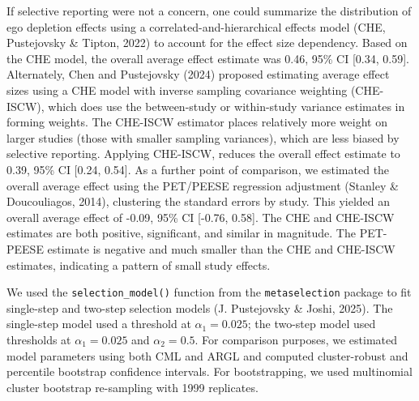 \documentclass[
  man, donotrepeattitle,floatsintext]{apa7}
\begin{document}
If selective reporting were not a concern, one could summarize the distribution of ego depletion effects using a correlated-and-hierarchical effects model (CHE, Pustejovsky \& Tipton, 2022) to account for the effect size dependency.
Based on the CHE model, the overall average effect estimate was 0.46, 95\% CI {[}0.34, 0.59{]}.
Alternately, Chen and Pustejovsky (2024) proposed estimating average effect sizes using a CHE model with inverse sampling covariance weighting (CHE-ISCW), which does use the between-study or within-study variance estimates in forming weights. The CHE-ISCW estimator places relatively more weight on larger studies (those with smaller sampling variances), which are less biased by selective reporting.
Applying CHE-ISCW, reduces the overall effect estimate to 0.39, 95\% CI {[}0.24, 0.54{]}.
As a further point of comparison, we estimated the overall average effect using the PET/PEESE regression adjustment (Stanley \& Doucouliagos, 2014), clustering the standard errors by study. This yielded an overall average effect of -0.09, 95\% CI {[}-0.76, 0.58{]}. The CHE and CHE-ISCW estimates are both positive, significant, and similar in magnitude. The PET-PEESE estimate is negative and much smaller than the CHE and CHE-ISCW estimates, indicating a pattern of small study effects.

We used the \texttt{selection\_model()} function from the \texttt{metaselection} package to fit single-step and two-step selection models (J. Pustejovsky \& Joshi, 2025).
The single-step model used a threshold at \(\alpha_1 = 0.025\); the two-step model used thresholds at \(\alpha_1 = 0.025\) and \(\alpha_2 = 0.5\).
For comparison purposes, we estimated model parameters using both CML and ARGL and computed cluster-robust and percentile bootstrap confidence intervals.
For bootstrapping, we used multinomial cluster bootstrap re-sampling with 1999 replicates.
\end{document}
